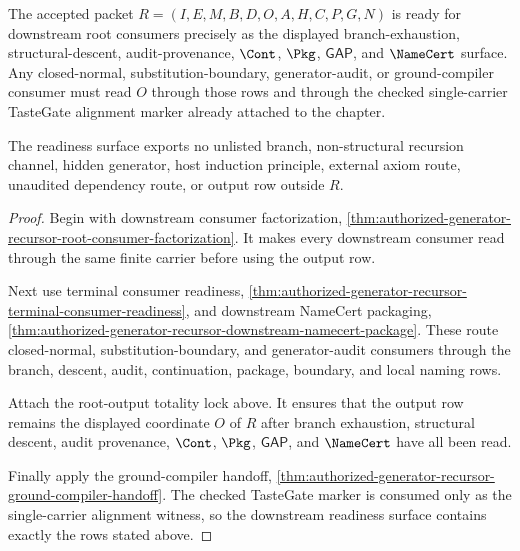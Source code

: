 \begin{theorem}
\label{thm:authorized-generator-recursor-root-consumer-readiness-surface}
The accepted packet $R=(I,E,M,B,D,O,A,H,C,P,G,N)$ is ready for downstream root consumers precisely as the displayed branch-exhaustion, structural-descent, audit-provenance, $\Cont$, $\Pkg$, $\mathsf{GAP}$, and $\NameCert$ surface. Any closed-normal, substitution-boundary, generator-audit, or ground-compiler consumer must read $O$ through those rows and through the checked single-carrier TasteGate alignment marker already attached to the chapter.

The readiness surface exports no unlisted branch, non-structural recursion channel, hidden generator, host induction principle, external axiom route, unaudited dependency route, or output row outside $R$.
\end{theorem}
\begin{proof}
Begin with downstream consumer factorization, \autoref{thm:authorized-generator-recursor-root-consumer-factorization}. It makes every downstream consumer read through the same finite carrier before using the output row.

Next use terminal consumer readiness, \autoref{thm:authorized-generator-recursor-terminal-consumer-readiness}, and downstream NameCert packaging, \autoref{thm:authorized-generator-recursor-downstream-namecert-package}. These route closed-normal, substitution-boundary, and generator-audit consumers through the branch, descent, audit, continuation, package, boundary, and local naming rows.

Attach the root-output totality lock above. It ensures that the output row remains the displayed coordinate $O$ of $R$ after branch exhaustion, structural descent, audit provenance, $\Cont$, $\Pkg$, $\mathsf{GAP}$, and $\NameCert$ have all been read.

Finally apply the ground-compiler handoff, \autoref{thm:authorized-generator-recursor-ground-compiler-handoff}. The checked TasteGate marker is consumed only as the single-carrier alignment witness, so the downstream readiness surface contains exactly the rows stated above.
\end{proof}

